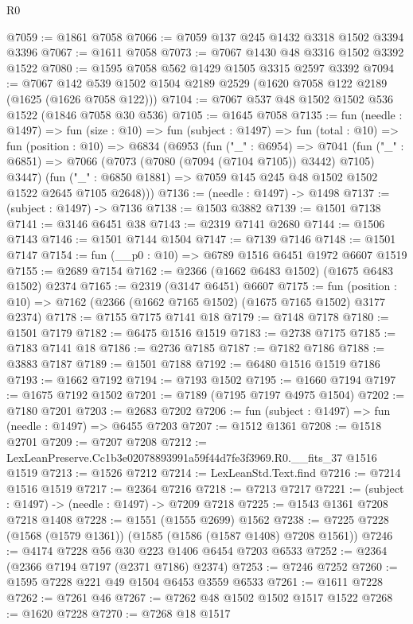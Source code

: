 \begin{lexlean}{R0}
\begin{coremodule}
@7059 := @1861 @7058
@7066 := @7059 @137 @245 @1432 @3318 @1502 @3394 @3396
@7067 := @1611 @7058
@7073 := @7067 @1430 @48 @3316 @1502 @3392 @1522
@7080 := @1595 @7058 @562 @1429 @1505 @3315 @2597 @3392
@7094 := @7067 @142 @539 @1502 @1504 @2189 @2529 (@1620 @7058 @122 @2189 (@1625 (@1626 @7058 @122)))
@7104 := @7067 @537 @48 @1502 @1502 @536 @1522 (@1846 @7058 @30 @536)
@7105 := @1645 @7058
@7135 := fun (needle : @1497) =>
  fun (size : @10) =>
  fun (subject : @1497) =>
  fun (total : @10) =>
  fun (position : @10) =>
  @6834
    (@6953
      (fun ("_" : @6954) =>
      @7041
        (fun ("_" : @6851) => @7066 (@7073 (@7080 (@7094 (@7104 @7105)) @3442) @7105) @3447)
        (fun ("_" : @6850 @1881) => @7059 @145 @245 @48 @1502 @1502 @1522 @2645 @7105 @2648)))
@7136 := (needle : @1497) -> @1498
@7137 := (subject : @1497) -> @7136
@7138 := @1503 @3882
@7139 := @1501 @7138
@7141 := @3146 @6451 @38
@7143 := @2319 @7141 @2680
@7144 := @1506 @7143
@7146 := @1501 @7144 @1504
@7147 := @7139 @7146
@7148 := @1501 @7147
@7154 := fun (__p0 : @10) => @6789 @1516 @6451 @1972 @6607 @1519
@7155 := @2689 @7154
@7162 := @2366 (@1662 @6483 @1502) (@1675 @6483 @1502) @2374
@7165 := @2319 (@3147 @6451) @6607
@7175 := fun (position : @10) => @7162 (@2366 (@1662 @7165 @1502) (@1675 @7165 @1502) @3177 @2374)
@7178 := @7155 @7175 @7141 @18
@7179 := @7148 @7178
@7180 := @1501 @7179
@7182 := @6475 @1516 @1519
@7183 := @2738 @7175
@7185 := @7183 @7141 @18
@7186 := @2736 @7185
@7187 := @7182 @7186
@7188 := @3883 @7187
@7189 := @1501 @7188
@7192 := @6480 @1516 @1519 @7186
@7193 := @1662 @7192
@7194 := @7193 @1502
@7195 := @1660 @7194
@7197 := @1675 @7192 @1502
@7201 := @7189 (@7195 @7197 @4975 @1504)
@7202 := @7180 @7201
@7203 := @2683 @7202
@7206 := fun (subject : @1497) => fun (needle : @1497) => @6455 @7203
@7207 := @1512 @1361
@7208 := @1518 @2701
@7209 := @7207 @7208
@7212 := LexLeanPreserve.Cc1b3e02078893991a59f44d7fe3f3969.R0.__fits_37 @1516 @1519
@7213 := @1526 @7212
@7214 := LexLeanStd.Text.find
@7216 := @7214 @1516 @1519
@7217 := @2364 @7216
@7218 := @7213 @7217
@7221 := (subject : @1497) -> (needle : @1497) -> @7209 @7218
@7225 := @1543 @1361 @7208 @7218 @1408
@7228 := @1551 (@1555 @2699) @1562
@7238 := @7225 @7228 (@1568 (@1579 @1361)) (@1585 (@1586 (@1587 @1408) @7208 @1561))
@7246 := @4174 @7228 @56 @30 @223 @1406 @6454 @7203 @6533
@7252 := @2364 (@2366 @7194 @7197 (@2371 @7186) @2374)
@7253 := @7246 @7252
@7260 := @1595 @7228 @221 @49 @1504 @6453 @3559 @6533
@7261 := @1611 @7228
@7262 := @7261 @46
@7267 := @7262 @48 @1502 @1502 @1517 @1522
@7268 := @1620 @7228
@7270 := @7268 @18 @1517

\end{coremodule}
\end{lexlean}

